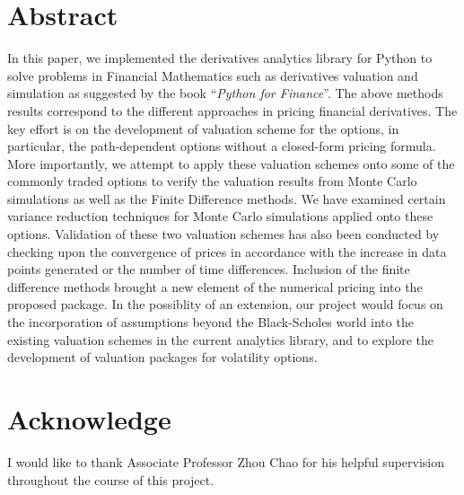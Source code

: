 \section*{Abstract}
In this paper, we implemented the derivatives analytics library for Python to solve problems in Financial Mathematics such as derivatives valuation and simulation as suggested by the book ``\emph{Python for Finance}''\cite{PythonForFinance}. The above methods results correspond to the different approaches in pricing financial derivatives. The key effort is on the development of valuation scheme for the options, in particular, the path-dependent options without a closed-form pricing formula. More importantly, we attempt to apply these valuation schemes onto some of the commonly traded options to verify the valuation results from Monte Carlo simulations as well as the Finite Difference methods. We have examined certain variance reduction techniques for Monte Carlo simulations applied onto these options. Validation of these two valuation schemes has also been conducted by checking upon the convergence of prices in accordance with the increase in data points generated or the number of time differences. Inclusion of the finite difference methods brought a new element of the numerical pricing into the proposed package. In the possiblity of an extension, our project would focus on the incorporation of assumptions beyond the Black-Scholes world into the existing valuation schemes in the current analytics library, and to explore the development of valuation packages for volatility options.

\section*{Acknowledge}
I would like to thank Associate Professor Zhou Chao for his helpful supervision
throughout the course of this project.
\newpage
\tableofcontents
\newpage

